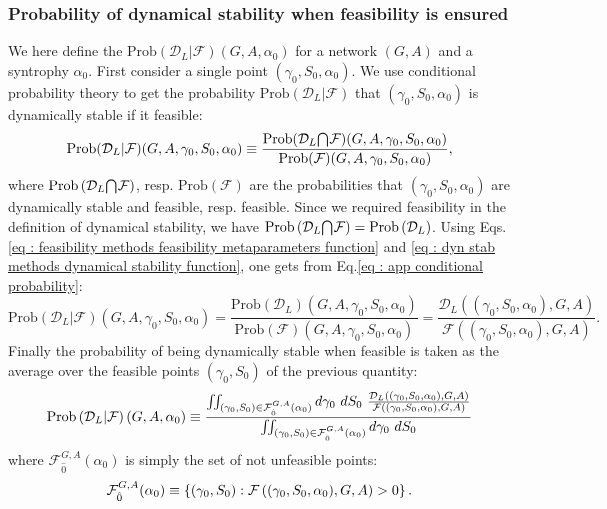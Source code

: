 \documentclass[12pt, titlepage, twoside, openright]{report}
\begin{document}
\subsubsection{Probability of dynamical stability when feasibility is ensured}\label{app : probability of being dynamically stable when feasible}
We here define the  $\text{Prob}\left(\mathcal{D}_L | \mathcal{F}\right)(G,A, \alpha_0)$ for a network $(G,A)$ and a syntrophy $\alpha_0$. First consider a single point $(\gamma_0, S_0, \alpha_0)$. We use conditional probability theory \cite{kolmogorov_foundations_1960} to get the probability $\text{Prob}(\mathcal{D}_L | \mathcal{F})$ that $(\gamma_0, S_0, \alpha_0)$ is dynamically stable if it feasible:
\begin{equation}
\text{Prob}(\mathcal{D}_L | \mathcal{F})(G, A, \gamma_0, S_0, \alpha_0) \equiv \frac{\text{Prob}(\mathcal{D}_L {\bigcap}_{} \mathcal{F})(G, A, \gamma_0, S_0, \alpha_0)}{\text{Prob}(\mathcal{F})(G, A, \gamma_0, S_0, \alpha_0)}, \label{eq : app conditional probability}
\end{equation}
where $\text{Prob}\left(\mathcal{D}_L {\bigcap}_{} \mathcal{F}\right)$, resp. $\text{Prob}\left(\mathcal{F}\right)$ are the probabilities that $(\gamma_0, S_0, \alpha_0)$ are dynamically stable and feasible, resp. feasible. Since we required feasibility in the definition of dynamical stability, we have $\text{Prob}\left(\mathcal{D}_L {\bigcap}_{} \mathcal{F}\right)=\text{Prob}\left(\mathcal{D}_L\right)$. Using Eqs.\eqref{eq : feasibility methods feasibility metaparameters function} and \eqref{eq : dyn stab methods dynamical stability function}, one gets from Eq.\eqref{eq : app conditional probability}:
\begin{equation}
\text{Prob}(\mathcal{D}_L | \mathcal{F})(G, A, \gamma_0, S_0, \alpha_0) = \frac{\text{Prob}(\mathcal{D}_L)(G, A, \gamma_0, S_0, \alpha_0)}{\text{Prob}(\mathcal{F})(G, A, \gamma_0, S_0, \alpha_0)} = \frac{\mathcal{D}_L\left((\gamma_0, S_0, \alpha_0), G, A\right)}{\mathcal{F}\left((\gamma_0, S_0, \alpha_0), G, A\right)}.
\end{equation}
Finally the probability of being dynamically stable when feasible is taken as the average over the feasible points $(\gamma_0, S_0)$ of the previous quantity:
\begin{equation}
\text{Prob}\left(\mathcal{D}_L | \mathcal{F}\right)(G, A, \alpha_0) \defined \frac{\iint_{(\gamma_0, S_0) \in \mathcal{F}^{G,A}_{\hat{0}}(\alpha_0)}d\gamma_0 \ dS_0 \ \frac{\mathcal{D}_L\left((\gamma_0, S_0, \alpha_0), G, A\right)}{\mathcal{F}\left((\gamma_0, S_0, \alpha_0), G, A\right)}}{\iint_{(\gamma_0, S_0) \in \mathcal{F}^{G,A}_{\hat{0}}(\alpha_0)}d\gamma_0 \ dS_0 }
\end{equation}
where $\mathcal{F}^{G,A}_{\hat{0}}(\alpha_0)$ is simply the set of not unfeasible points:
\begin{equation}
\mathcal{F}^{G,A}_{\hat{0}}(\alpha_0) \equiv \left\{(\gamma_0, S_0) : \mathcal{F}\left((\gamma_0, S_0, \alpha_0), G, A\right) > 0\right\}.
\end{equation}
\end{document}
